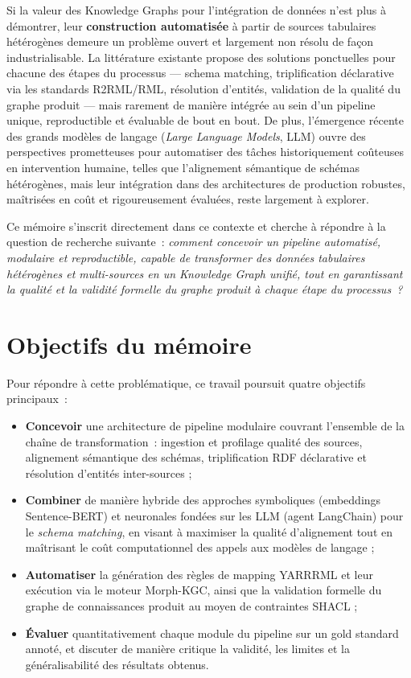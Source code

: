 Si la valeur des Knowledge Graphs pour l'intégration de données
n'est plus à démontrer, leur \textbf{construction automatisée} à
partir de sources tabulaires hétérogènes demeure un problème ouvert
et largement non résolu de façon industrialisable. La littérature
existante propose des solutions ponctuelles pour chacune des étapes
du processus — schema matching, triplification déclarative via les
standards R2RML/RML, résolution d'entités, validation de la
qualité du graphe produit — mais rarement de manière intégrée au
sein d'un pipeline unique, reproductible et évaluable de bout en
bout. De plus, l'émergence récente des grands modèles de langage
(\textit{Large Language Models}, LLM) ouvre des perspectives
prometteuses pour automatiser des tâches historiquement coûteuses en
intervention humaine, telles que l'alignement sémantique de schémas
hétérogènes, mais leur intégration dans des architectures de
production robustes, maîtrisées en coût et rigoureusement évaluées,
reste largement à explorer.
 
Ce mémoire s'inscrit directement dans ce contexte et cherche à
répondre à la question de recherche suivante~: \textit{comment
concevoir un pipeline automatisé, modulaire et reproductible, capable
de transformer des données tabulaires hétérogènes et multi-sources en
un Knowledge Graph unifié, tout en garantissant la qualité et la
validité formelle du graphe produit à chaque étape du processus~?}
 
\section*{Objectifs du mémoire}
 
Pour répondre à cette problématique, ce travail poursuit quatre
objectifs principaux~:
 
\begin{itemize}
    \item \textbf{Concevoir} une architecture de pipeline modulaire
    couvrant l'ensemble de la chaîne de transformation~: ingestion et
    profilage qualité des sources, alignement sémantique des schémas,
    triplification RDF déclarative et résolution d'entités
    inter-sources ;
    \item \textbf{Combiner} de manière hybride des approches
    symboliques (embeddings Sentence-BERT) et neuronales fondées sur
    les LLM (agent LangChain) pour le \textit{schema matching}, en
    visant à maximiser la qualité d'alignement tout en maîtrisant le
    coût computationnel des appels aux modèles de langage ;
    \item \textbf{Automatiser} la génération des règles de mapping
    YARRRML et leur exécution via le moteur Morph-KGC, ainsi que la
    validation formelle du graphe de connaissances produit au moyen
    de contraintes SHACL ;
    \item \textbf{Évaluer} quantitativement chaque module du pipeline
    sur un gold standard annoté, et discuter de manière critique la
    validité, les limites et la généralisabilité des résultats
    obtenus.
\end{itemize}
 

